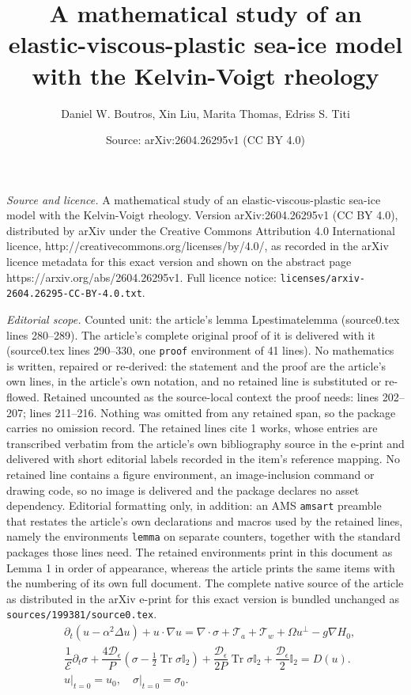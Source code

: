 \documentclass[10pt,a4paper]{amsart}
\title{A mathematical study of an elastic-viscous-plastic sea-ice model with the Kelvin-Voigt rheology}
\author{Daniel W. Boutros, Xin Liu, Marita Thomas, Edriss S. Titi}
\date{Source: arXiv:2604.26295v1 (CC BY 4.0)}
\DeclareMathOperator{\Tr}{Tr}
\begin{document}
\maketitle

\noindent\emph{Source and licence.} A mathematical study of an elastic-viscous-plastic sea-ice model with the Kelvin-Voigt rheology. Version arXiv:2604.26295v1 (CC BY 4.0), distributed by arXiv under the Creative Commons Attribution 4.0 International licence, http://creativecommons.org/licenses/by/4.0/, as recorded in the arXiv licence metadata for this exact version and shown on the abstract page https://arxiv.org/abs/2604.26295v1. Full licence notice: \texttt{licenses/arxiv-2604.26295-CC-BY-4.0.txt}.\par\smallskip

\noindent\textit{Editorial scope.} Counted unit: the article's lemma Lpestimatelemma (source0.tex lines 280--289). The article's complete original proof of it is delivered with it (source0.tex lines 290--330, one \texttt{proof} environment of 41 lines). No mathematics is written, repaired or re-derived: the statement and the proof are the article's own lines, in the article's own notation, and no retained line is substituted or re-flowed.  Retained uncounted as the source-local context the proof needs: lines 202--207; lines 211--216.  Nothing was omitted from any retained span, so the package carries no omission record.  The retained lines cite 1 works, whose entries are transcribed verbatim from the article's own bibliography source in the e-print and delivered with short editorial labels recorded in the item's reference mapping.  No retained line contains a figure environment, an image-inclusion command or drawing code, so no image is delivered and the package declares no asset dependency.  Editorial formatting only, in addition: an AMS \texttt{amsart} preamble that restates the article's own declarations and macros used by the retained lines, namely the environments \texttt{lemma} on separate counters, together with the standard packages those lines need.  The retained environments print in this document as Lemma 1 in order of appearance, whereas the article prints the same items with the numbering of its own full document.  The complete native source of the article as distributed in the arXiv e-print for this exact version is bundled unchanged as \texttt{sources/199381/source0.tex}.
\begin{align}
&\partial_t (u - \alpha^2 \Delta u) + u \cdot \nabla u  = \nabla \cdot \sigma + \mathcal{T}_a + \mathcal{T}_w + \Omega u^\perp - g \nabla H_0, \label{advection1epsilon} \\
&\dfrac{1}{\mathcal E} \partial_t \sigma + \dfrac{4 \mathcal{D}_\epsilon}{P} (\sigma - \frac{1}{2} \Tr \sigma \mathbb I_2) + \dfrac{\mathcal{D}_\epsilon}{2P} \Tr \sigma \mathbb I_2 + \dfrac{\mathcal{D}_\epsilon}{2} \mathbb I_2  = D(u). \label{advection2epsilon}
\\
&u \lvert_{t = 0} = u_0, \quad \sigma \lvert_{t = 0} = \sigma_0. \label{advection3epsilon}
\end{align}
\end{document}
